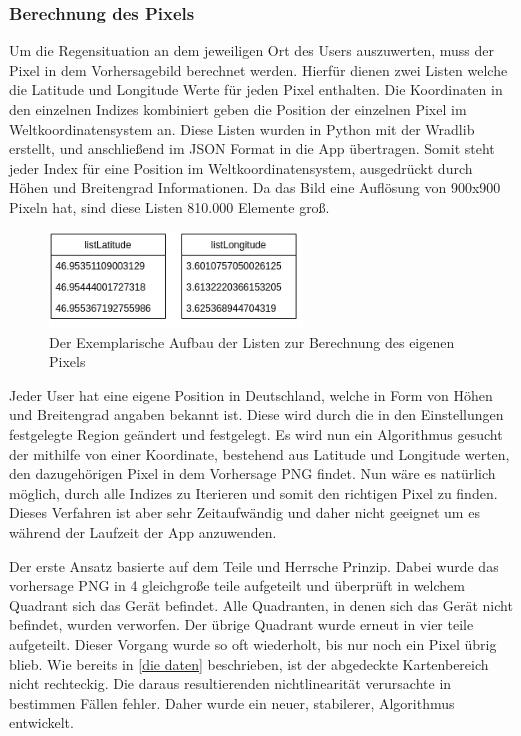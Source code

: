 \subsubsection{Berechnung des Pixels} \label{sec: pixel_berechnung}
Um die Regensituation an dem jeweiligen Ort des Users auszuwerten, muss der Pixel in dem Vorhersagebild berechnet werden. 
Hierfür dienen zwei Listen welche die Latitude und Longitude Werte für jeden Pixel enthalten. 
Die Koordinaten in den einzelnen Indizes kombiniert geben die Position der einzelnen Pixel im Weltkoordinatensystem an.
Diese Listen wurden in Python mit der Wradlib erstellt, und anschließend im JSON Format in die App übertragen. 
Somit steht jeder Index für eine Position im Weltkoordinatensystem, ausgedrückt durch Höhen und Breitengrad Informationen.
Da das Bild eine Auflösung von 900x900 Pixeln hat, sind diese Listen 810.000 Elemente groß.
\begin{figure}[H]
  \centering
  \includegraphics[width=0.6\textwidth,angle=0]{abb/listen_pixel_berechnung.png}
  \caption{Der Exemplarische Aufbau der Listen zur Berechnung des eigenen Pixels}
 \label{fig:sequence_diagram_app_start}
 \end{figure}
 \noindent Jeder User hat eine eigene Position in Deutschland, welche in Form von Höhen und Breitengrad angaben bekannt ist. 
 Diese wird durch die in den Einstellungen festgelegte Region geändert und festgelegt. 
 Es wird nun ein Algorithmus gesucht der mithilfe von einer Koordinate, bestehend aus Latitude und Longitude werten, den dazugehörigen Pixel in dem Vorhersage PNG findet. 
 Nun wäre es natürlich möglich, durch alle Indizes zu Iterieren und somit den richtigen Pixel zu finden. 
 Dieses Verfahren ist aber sehr Zeitaufwändig und daher nicht geeignet um es während der Laufzeit der App anzuwenden.

 \noindent Der erste Ansatz basierte auf dem Teile und Herrsche Prinzip. 
 Dabei wurde das vorhersage PNG in 4 gleichgroße teile aufgeteilt und überprüft in welchem Quadrant sich das Gerät befindet.
 Alle Quadranten, in denen sich das Gerät nicht befindet, wurden verworfen. 
 Der übrige Quadrant wurde erneut in vier teile aufgeteilt. 
 Dieser Vorgang wurde so oft wiederholt, bis nur noch ein Pixel übrig blieb. 
 Wie bereits in \ref{die daten} beschrieben, ist der abgedeckte Kartenbereich nicht rechteckig. 
 Die daraus resultierenden nichtlinearität verursachte in bestimmen Fällen fehler. 
 Daher wurde ein neuer, stabilerer, Algorithmus entwickelt. 
 
